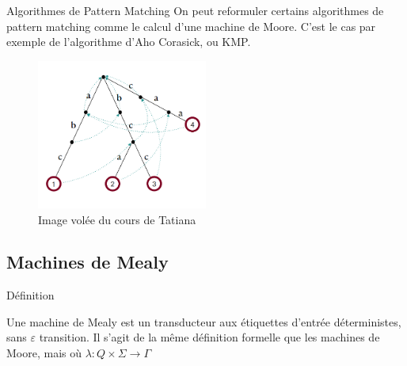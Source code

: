 \documentclass{beamer}
\begin{document}
\begin{frame}{Algorithmes de Pattern Matching}
    On peut reformuler certains algorithmes de pattern matching comme le calcul d'une machine de Moore.
    C'est le cas par exemple de l'algorithme d'Aho Corasick, ou KMP.

    \begin{figure}[h]
        \includegraphics[width = 0.5\textwidth]{Arbre Aho-Corasick.png}
        \\
        Image volée du cours de Tatiana
    \end{figure}
\end{frame}

\subsection{Machines de Mealy}

\begin{frame}{Définition}
    \begin{definition}
        Une machine de Mealy est un transducteur aux étiquettes d'entrée déterministes, sans $\varepsilon$ transition. Il
        s'agit de la même définition formelle que les machines de Moore, mais où $\lambda : Q \times \Sigma \rightarrow \Gamma$
    \end{definition}
\end{frame}
\end{document}
